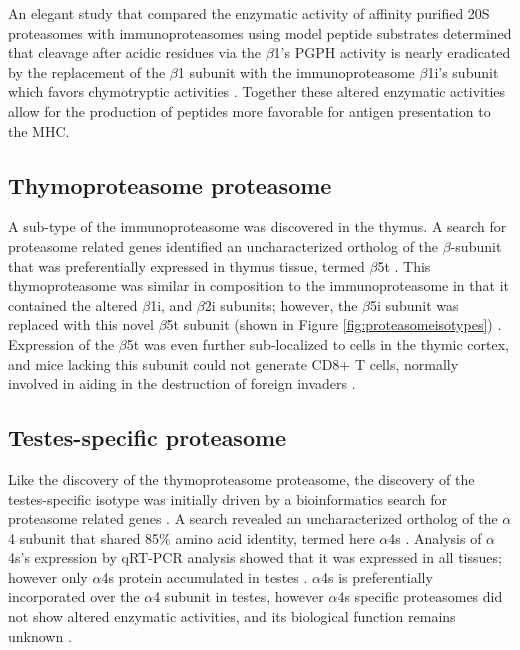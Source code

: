 An elegant study that compared the enzymatic activity of affinity purified 20S proteasomes with immunoproteasomes using model peptide substrates determined that cleavage after acidic residues via the $\beta$1's PGPH activity is nearly eradicated by the replacement of the $\beta$1 subunit with the immunoproteasome $\beta$1i's subunit which favors chymotryptic activities \citep{dahlmann00}. Together these altered enzymatic activities allow for the production of peptides more favorable for antigen presentation to the MHC. 

\subsection{Thymoproteasome proteasome}
	A sub-type of the immunoproteasome was discovered in the thymus. A search for proteasome related genes identified an uncharacterized ortholog of the $\beta$-subunit that was preferentially expressed in thymus tissue, termed $\beta$5t \citep{murata07}. This thymoproteasome was similar in composition to the immunoproteasome in that it contained the altered $\beta$1i, and $\beta$2i subunits; however, the $\beta$5i subunit was replaced with this novel $\beta$5t subunit (shown in Figure \ref{fig:proteasomeisotypes})  \citep{murata07}. Expression of the $\beta$5t was even further sub-localized to cells in the thymic cortex, and mice lacking this subunit could not generate CD8+ T cells, normally involved in aiding in the destruction of foreign invaders \citep{murata07}. 

\subsection{Testes-specific proteasome}
	Like the discovery of the thymoproteasome proteasome, the discovery of the testes-specific isotype was initially driven by a bioinformatics search for proteasome related genes \citep{uechi14}. A search revealed an uncharacterized ortholog of the $\alpha$4 subunit that shared 85\% amino acid identity, termed here $\alpha$4s \citep{uechi14}. Analysis of $\alpha$4s's expression by qRT-PCR analysis showed that it was expressed in all tissues; however only $\alpha$4s protein accumulated in testes \citep{uechi14}. $\alpha$4s is preferentially incorporated over the $\alpha$4 subunit in testes, however $\alpha$4s specific proteasomes did not show altered enzymatic activities, and its biological function remains unknown \citep{uechi14}.  

